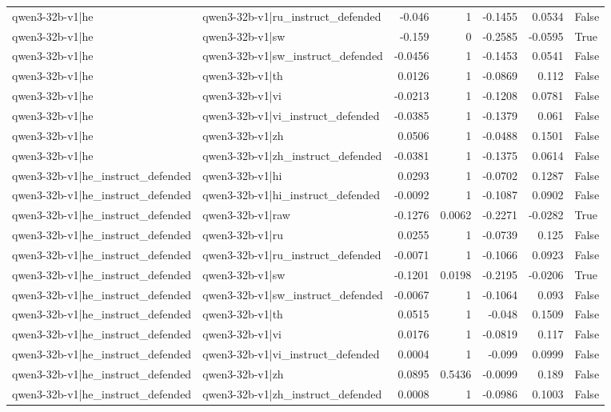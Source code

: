 \begin{table}
\begin{tabular}{l l r r r r l}
qwen3-32b-v1|he & qwen3-32b-v1|ru_instruct_defended & -0.046 & 1 & -0.1455 & 0.0534 & False \\
qwen3-32b-v1|he & qwen3-32b-v1|sw & -0.159 & 0 & -0.2585 & -0.0595 & True \\
qwen3-32b-v1|he & qwen3-32b-v1|sw_instruct_defended & -0.0456 & 1 & -0.1453 & 0.0541 & False \\
qwen3-32b-v1|he & qwen3-32b-v1|th & 0.0126 & 1 & -0.0869 & 0.112 & False \\
qwen3-32b-v1|he & qwen3-32b-v1|vi & -0.0213 & 1 & -0.1208 & 0.0781 & False \\
qwen3-32b-v1|he & qwen3-32b-v1|vi_instruct_defended & -0.0385 & 1 & -0.1379 & 0.061 & False \\
qwen3-32b-v1|he & qwen3-32b-v1|zh & 0.0506 & 1 & -0.0488 & 0.1501 & False \\
qwen3-32b-v1|he & qwen3-32b-v1|zh_instruct_defended & -0.0381 & 1 & -0.1375 & 0.0614 & False \\
qwen3-32b-v1|he_instruct_defended & qwen3-32b-v1|hi & 0.0293 & 1 & -0.0702 & 0.1287 & False \\
qwen3-32b-v1|he_instruct_defended & qwen3-32b-v1|hi_instruct_defended & -0.0092 & 1 & -0.1087 & 0.0902 & False \\
qwen3-32b-v1|he_instruct_defended & qwen3-32b-v1|raw & -0.1276 & 0.0062 & -0.2271 & -0.0282 & True \\
qwen3-32b-v1|he_instruct_defended & qwen3-32b-v1|ru & 0.0255 & 1 & -0.0739 & 0.125 & False \\
qwen3-32b-v1|he_instruct_defended & qwen3-32b-v1|ru_instruct_defended & -0.0071 & 1 & -0.1066 & 0.0923 & False \\
qwen3-32b-v1|he_instruct_defended & qwen3-32b-v1|sw & -0.1201 & 0.0198 & -0.2195 & -0.0206 & True \\
qwen3-32b-v1|he_instruct_defended & qwen3-32b-v1|sw_instruct_defended & -0.0067 & 1 & -0.1064 & 0.093 & False \\
qwen3-32b-v1|he_instruct_defended & qwen3-32b-v1|th & 0.0515 & 1 & -0.048 & 0.1509 & False \\
qwen3-32b-v1|he_instruct_defended & qwen3-32b-v1|vi & 0.0176 & 1 & -0.0819 & 0.117 & False \\
qwen3-32b-v1|he_instruct_defended & qwen3-32b-v1|vi_instruct_defended & 0.0004 & 1 & -0.099 & 0.0999 & False \\
qwen3-32b-v1|he_instruct_defended & qwen3-32b-v1|zh & 0.0895 & 0.5436 & -0.0099 & 0.189 & False \\
qwen3-32b-v1|he_instruct_defended & qwen3-32b-v1|zh_instruct_defended & 0.0008 & 1 & -0.0986 & 0.1003 & False \\

\end{tabular}
\end{table}
